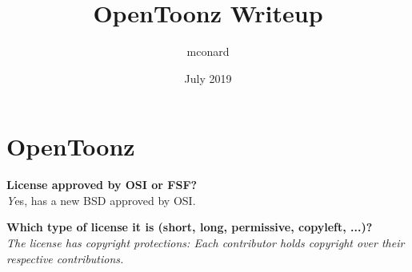 \documentclass{article}
\title{OpenToonz Writeup}
\author{mconard }
\date{July 2019}
\begin{document}
\maketitle

\section{OpenToonz}

\textbf{License approved by OSI or FSF?}\\
\textit Yes, has a new BSD approved by OSI.\newline

\textbf{Which type of license it is (short, long, permissive, copyleft, ...)?}\\ 
\textit{The license has copyright protections: Each contributor holds copyright over their respective contributions.}\newline
\end{document}
